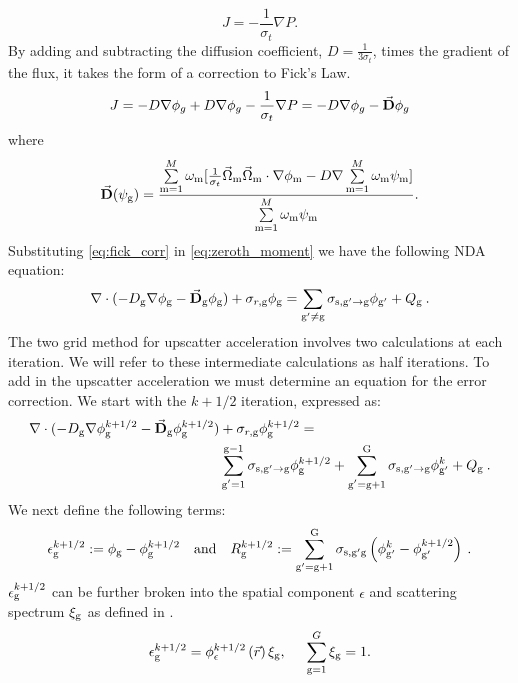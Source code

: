   \begin{equation}
  J= -\frac{1}{\sigma_t} \nabla P. 
  \end{equation}
  By adding and subtracting the diffusion coefficient, $D = \frac{1}{3\sigma_t}$, times the gradient of the flux, it takes the form of a correction to Fick's Law. 
  \begin{equation}
  J = -D \nabla \phi_g + D \nabla \phi_g - \frac{1}{\sigma_t} \nabla P \\
  = -D \nabla \phi_g - \vec{\textbf{D}} \phi_g
  \label{eq:fick_corr}
  \end{equation}
  where 
 \begin{equation}
  \vec{\textbf{D}} (\psi_{\mathrm{g}}) = \frac{\sum\limits_{\mathrm{m}=1}^M \omega_{\mathrm{m}} [\frac{1}{\sigma_t} \vec{\Omega}_{\mathrm{m}} \vec{\Omega}_{\mathrm{m}} \cdot \nabla\phi_{\mathrm{m}} - D \nabla \sum\limits_{\mathrm{m}=1}^M \omega_{\mathrm{m}}\psi_{\mathrm{m}}]}{\sum\limits_{\mathrm{m}=1}^M \omega_{\mathrm{m}} \psi_{\mathrm{m}}}.
  \end{equation} 
 Substituting \eqref{eq:fick_corr} in \eqref{eq:zeroth_moment} we have the following NDA equation:
  \begin{equation}
  \nabla\cdot(-D_{\mathrm{g}} \nabla \phi_{\mathrm{g}} - \vec{\bf D}_{\mathrm{g}} \phi_{\mathrm{g}}) + \sigma_{r,\mathrm{g}} \phi_{\mathrm{g}} = \sum\limits_{{\mathrm{g}'}\neq\mathrm{g}}\sigma_{\mathrm{s},\mathrm{g}' \rightarrow \mathrm{g}}\phi_{\mathrm{g}'} + Q_{\mathrm{g}} \:. \label{eq:NDA}
  \end{equation}
  The two grid method for upscatter acceleration involves two calculations at each iteration. We will refer to these intermediate calculations as half iterations. To add in the upscatter acceleration we must determine an equation for the error correction. We start with the $k + 1/2$ iteration, expressed as:
  \begin{equation}
  \begin{split}
  \nabla\cdot(-D_{\mathrm{g}} \nabla \phi_{\mathrm{g}}^{k+1/2} - \vec{\bf D}_{\mathrm{g}} \phi_{\mathrm{g}}^{k+1/2}) &+ \sigma_{r,\mathrm{g}} \phi_{\mathrm{g}}^{k+1/2} =  \\ &\sum\limits_{\substack{\mathrm{g}'=1}}^{\mathrm{g-1}} \sigma_{\mathrm{s},\mathrm{g}' \to\mathrm{g}}\phi_{\mathrm{g}}^{k+1/2} + \sum\limits_{\substack{\mathrm{g}'=\mathrm{g}+1}}^{\mathrm{G}} \sigma_{\mathrm{s},\mathrm{g}' \to\mathrm{g}}\phi_{\mathrm{g}'}^{k} + Q_{\mathrm{g}}\:. 
  \end{split}
  \label{eq:k1/2}
  \end{equation}
  We next define the following terms:
  \begin{equation}
  \epsilon_{\mathrm{g}}^{k+1/2} := \phi_{\mathrm{g}} - \phi_{\mathrm{g}}^{k + 1/2} \quad \mathrm{and} \quad R_{\mathrm{g}}^{k+1/2} := \sum\limits_{\mathrm{g}'=\mathrm{g}+1}^{\mathrm{G}} \sigma_{\mathrm{s},\mathrm{g}' \mathrm{g}}\left(\phi_{\mathrm{g}'}^k - \phi_{\mathrm{g}'}^{k + 1/2}\right)\:.
  \end{equation}
  $\epsilon_{\mathrm{g}}^{k + 1/2}$ can be further broken into the spatial component $\epsilon$ and scattering spectrum $\xi_{\mathrm{g}}$ as defined in \cite{morel-upscat,evans-upscat}.
  \begin{equation}
  \epsilon_{\mathrm{g}}^{k+1/2} = \phi_{\epsilon}^{k+1/2}\left(\vec{r}\right)\xi_{\mathrm{g}}, \hspace{5mm} \sum\limits_{\mathrm{g}=1}^G \xi_{\mathrm{g}} = 1.
  \end{equation}
  
